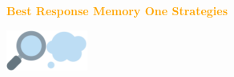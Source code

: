 \documentclass{beamer}
\begin{document}
\begin{frame}
    \begin{center}
    \textcolor{orange}{\large{\textbf{Best Response Memory One Strategies}}} \vspace{1cm}

    \includegraphics[width=0.10\textwidth]{static/look.png}\hspace{2pt}\includegraphics[width=0.10\textwidth]{static/memone.png}
    \end{center}
\end{frame}

\begin{frame}
    \begin{center}
    
    \end{center}
\end{frame}

\begin{frame}
    \begin{center}
        
    \end{center}
\end{frame}
\end{document}
